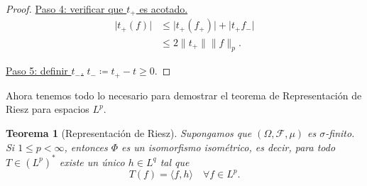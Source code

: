 \documentclass{article}
\newtheorem{Teorema}{Teorema}
\theoremstyle{plain}
\theoremstyle{definition}
\newcommand{\1}[1]{\mathbbm{1}\left( #1 \right)}
\newcommand{\abs}[1]{\lvert #1 \rvert}
\newcommand{\norm}[1]{\lVert #1 \rVert}
\begin{document}
\begin{proof}
  \underline{Paso 4: verificar que \(t_+\) es acotado.}
  \begin{align*}
    \abs{ t_{+}(f) }
    &\le
    \abs{t_{+}(f_{+})} + \abs{t_{+} f_{-}}
    \\&\le
    2 \norm{t_{+}} \norm{f}_{p}.
  \end{align*}

  \underline{Paso 5: definir \(t_{-}\).} 
  \(t_{-} \coloneqq t_{+} - t \ge 0\).
\end{proof}

Ahora tenemos todo lo necesario para demostrar el teorema de Representación de Riesz
para espacios \(L^p\). 

\begin{Teorema}[Representación de Riesz]
  Supongamos que \((\Omega,\mathcal{F},\mu)\) es \(\sigma\)-finito. Si \(1\le p < \infty\), entonces
  \(\Phi\) es un isomorfismo isométrico, es decir,
  para todo \(T\in (L^p)^{\ast}\) existe un único \(h\in L^{q}\) tal que
  \begin{displaymath}
    T(f) = \langle f, h \rangle \quad\forall f\in L^{p}.
  \end{displaymath}
\end{Teorema}
\end{document}
